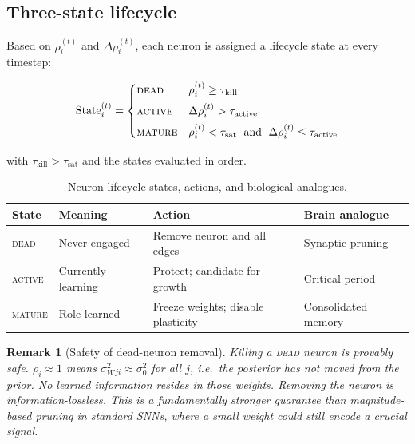 \documentclass[12pt, a4paper]{article}
\newtheorem{remark}{Remark}[section]
\newcommand{\sW}{\sigma^{2}_{W}}
\begin{document}
\subsection{Three-state lifecycle}

Based on $\rho_i^{(t)}$ and $\Delta\rho_i^{(t)}$, each neuron is assigned a lifecycle
state at every timestep:

\begin{equation}
    \text{State}_i^{(t)} =
    \begin{cases}
        \textsc{dead}   & \rho_i^{(t)} \geq \tau_{\text{kill}} \\[4pt]
        \textsc{active} & \Delta\rho_i^{(t)} > \tau_{\text{active}} \\[4pt]
        \textsc{mature} & \rho_i^{(t)} < \tau_{\text{sat}}
                          \;\text{ and }\;
                          \Delta\rho_i^{(t)} \leq \tau_{\text{active}}
    \end{cases}
    \label{eq:lifecycle}
\end{equation}

with $\tau_{\text{kill}} > \tau_{\text{sat}}$ and the states evaluated in order.

\begin{table}[h]
\centering
\renewcommand{\arraystretch}{1.25}
\begin{tabular}{@{}llll@{}}
\toprule
\textbf{State} & \textbf{Meaning} & \textbf{Action} & \textbf{Brain analogue} \\
\midrule
\textsc{dead}   & Never engaged & Remove neuron and all edges & Synaptic pruning \\
\textsc{active} & Currently learning & Protect; candidate for growth & Critical period \\
\textsc{mature} & Role learned & Freeze weights; disable plasticity & Consolidated memory \\
\bottomrule
\end{tabular}
\caption{Neuron lifecycle states, actions, and biological analogues.}
\label{tab:lifecycle}
\end{table}

\begin{remark}[Safety of dead-neuron removal]
Killing a \textsc{dead} neuron is provably safe. $\rho_i \approx 1$ means
$\sW_{ji} \approx \sigma^2_0$ for all $j$, i.e.\ the posterior has not moved from the
prior. No learned information resides in those weights. Removing the neuron is
information-lossless. This is a fundamentally stronger guarantee than magnitude-based
pruning in standard SNNs, where a small weight could still encode a crucial signal.
\end{remark}
\end{document}
